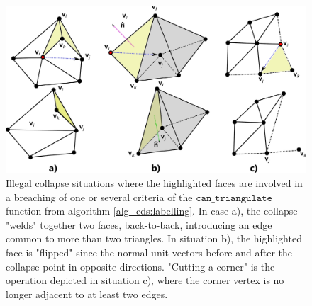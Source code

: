 \documentclass[graybox]{svmult}
\begin{document}
	
	\begin{figure}[t]
		\centering 
		\includegraphics[width=.95\columnwidth]{forbidden_collapses.pdf} 
		\caption{Illegal collapse situations where the highlighted faces are involved in a breaching of one or several criteria of the $\mathtt{can\_triangulate}$ function from algorithm  \ref{alg_cds:labelling}. In case a), the collapse "welds" together two faces, back-to-back, introducing an edge common to more than two triangles. In situation b), the highlighted face is "flipped" since the normal unit vectors before and after the collapse point in opposite directions. "Cutting a corner" is the operation depicted in situation c), where the corner vertex is no longer adjacent to at least two edges.} 
		\label{fig_cds:forbidden_collapses} 
	\end{figure}
	
\end{document}
